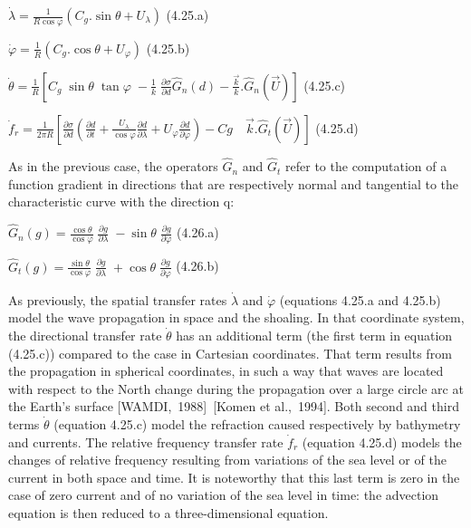 $\dot{\lambda }=\frac{1}{R\cos \varphi } \left(C_{g} .\sin \theta +U_{\lambda } \right)$ (4.25.a)

$\dot{\varphi }=\frac{1}{R} \left(C_{g} .\cos \theta +U_{\varphi } \right)$ (4.25.b)

$\dot{\theta }=\frac{1}{R} \left[C_{g} \; \sin \theta \; \tan \varphi \; -\frac{1}{k} \; \frac{\partial \sigma }{\partial d} \hat{G}_{n} (d)-\frac{\vec{k}}{k} .\hat{G}_{n} (\vec{U})\right]$ (4.25.c)

$\dot{f}_{r} =\frac{1}{2\pi R} \left[\frac{\partial \sigma }{\partial d} \left(\frac{\partial d}{\partial t} +\frac{U_{\lambda } }{\cos \varphi } \frac{\partial d}{\partial \lambda } +U_{\varphi } \frac{\partial d}{\partial \varphi } \right)-Cg\quad \vec{k}.\hat{G}_{t} (\vec{U})\right]$$ $ (4.25.d)

 As in the previous case, the operators $\hat{G}_{n} $ and $\hat{G}_{t} $ refer to the computation of a function gradient in directions that are respectively normal and tangential to the characteristic curve with the direction q:

$\hat{G}_{n} (g)=\frac{\cos \theta }{\cos \varphi } \; \frac{\partial g}{\partial \lambda } \; -\sin \theta \; \frac{\partial g}{\partial \varphi } $ (4.26.a)

$\hat{G}_{t} (g)=\frac{\sin \theta }{\cos \varphi } \; \frac{\partial g}{\partial \lambda } \; +\cos \theta \; \frac{\partial g}{\partial \varphi } $ (4.26.b)

 As previously, the spatial transfer rates $\dot{\lambda }$ and $\dot{\varphi }$ (equations 4.25.a and 4.25.b) model the wave propagation in space and the shoaling. In that coordinate system, the directional transfer rate $\dot{\theta }$ has an additional term (the first term in equation (4.25.c)) compared to the case in Cartesian coordinates. That term results from the propagation in spherical coordinates, in such a way that waves are located with respect to the North change during the propagation over a large circle arc at the Earth's surface [WAMDI,~1988]~[Komen et al.,~1994]. Both second and third terms $\dot{\theta }$ (equation 4.25.c) model the refraction caused respectively by bathymetry and currents. The relative frequency transfer rate $\dot{f}_{r} $ (equation 4.25.d) models the changes of relative frequency resulting from variations of the sea level or of the current in both space and time. It is noteworthy that this last term is zero in the case of zero current and of no variation of the sea level in time: the advection equation is then reduced to a three-dimensional equation.


